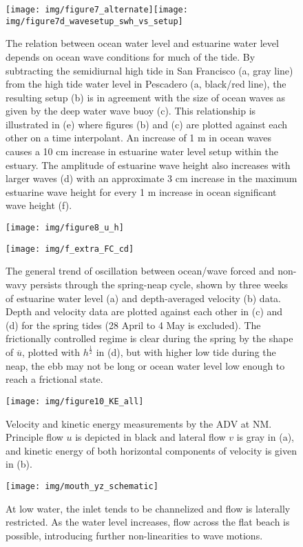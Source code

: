 \begin{figure}
\texttt{[image: img/figure7\_alternate]}\texttt{[image: img/figure7d\_wavesetup\_swh\_vs\_setup]}\protect\caption{The relation between ocean water level and estuarine water level depends
on ocean wave conditions for much of the tide. By subtracting the
semidiurnal high tide in San Francisco (a, gray line) from the high
tide water level in Pescadero (a, black/red line), the resulting setup
(b) is in agreement with the size of ocean waves as given by the deep
water wave buoy (c). This relationship is illustrated in (e) where
figures (b) and (c) are plotted against each other on a time interpolant.
An increase of 1 m in ocean waves causes a 10 cm increase in estuarine
water level setup within the estuary. The amplitude of estuarine wave
height also increases with larger waves (d) with an approximate 3
cm increase in the maximum estuarine wave height for every 1 m increase
in ocean significant wave height (f). \label{f7_setup}}
\end{figure}


\begin{figure}
\texttt{[image: img/figure8\_u\_h]}

\texttt{[image: img/f\_extra\_FC\_cd]}

\protect\caption{The general trend of oscillation between ocean/wave forced and non-wavy
persists through the spring-neap cycle, shown by three weeks of estuarine
water level (a) and depth-averaged velocity (b) data. Depth and velocity
data are plotted against each other in (c) and (d) for the spring
tides (28 April to 4 May is excluded). The frictionally controlled
regime is clear during the spring by the shape of $\overline{u}$,
plotted with $h^{\frac{1}{2}}$ in (d), but with higher low tide during
the neap, the ebb may not be long or ocean water level low enough
to reach a frictional state. \label{f8_ltHU}}
\end{figure}


\begin{figure}
\texttt{[image: img/figure10\_KE\_all]}\protect\caption{Velocity and kinetic energy measurements by the ADV at NM. Principle
flow $u$ is depicted in black and lateral flow $v$ is gray in (a),
and kinetic energy of both horizontal components of velocity is given
in (b). \label{f9_KE}}
\end{figure}


\begin{figure}
\texttt{[image: img/mouth\_yz\_schematic]}\protect\caption{At low water, the inlet tends to be channelized and flow is laterally
restricted. As the water level increases, flow across the flat beach
is possible, introducing further non-linearities to wave motions.
\label{f10_mouth_yz}}
\end{figure}


